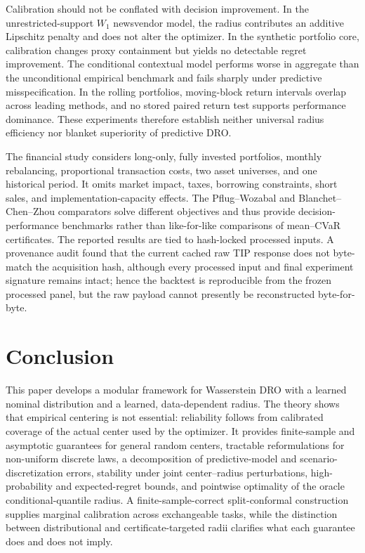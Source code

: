 \documentclass[11pt]{article}
\newcommand{\1}{\mathbf{1}}
\begin{document}
Calibration should not be conflated with decision improvement.  In the unrestricted-support $W_1$ newsvendor model, the radius contributes an additive Lipschitz penalty and does not alter the optimizer.  In the synthetic portfolio core, calibration changes proxy containment but yields no detectable regret improvement.  The conditional contextual model performs worse in aggregate than the unconditional empirical benchmark and fails sharply under predictive misspecification.  In the rolling portfolios, moving-block return intervals overlap across leading methods, and no stored paired return test supports performance dominance.  These experiments therefore establish neither universal radius efficiency nor blanket superiority of predictive DRO.

The financial study considers long-only, fully invested portfolios, monthly rebalancing, proportional transaction costs, two asset universes, and one historical period.  It omits market impact, taxes, borrowing constraints, short sales, and implementation-capacity effects.  The Pflug--Wozabal and Blanchet--Chen--Zhou comparators solve different objectives and thus provide decision-performance benchmarks rather than like-for-like comparisons of mean--CVaR certificates.  The reported results are tied to hash-locked processed inputs.  A provenance audit found that the current cached raw TIP response does not byte-match the acquisition hash, although every processed input and final experiment signature remains intact; hence the backtest is reproducible from the frozen processed panel, but the raw payload cannot presently be reconstructed byte-for-byte.

\section{Conclusion}

This paper develops a modular framework for Wasserstein DRO with a learned nominal distribution and a learned, data-dependent radius.  The theory shows that empirical centering is not essential: reliability follows from calibrated coverage of the actual center used by the optimizer.  It provides finite-sample and asymptotic guarantees for general random centers, tractable reformulations for non-uniform discrete laws, a decomposition of predictive-model and scenario-discretization errors, stability under joint center--radius perturbations, high-probability and expected-regret bounds, and pointwise optimality of the oracle conditional-quantile radius.  A finite-sample-correct split-conformal construction supplies marginal calibration across exchangeable tasks, while the distinction between distributional and certificate-targeted radii clarifies what each guarantee does and does not imply.
\end{document}
